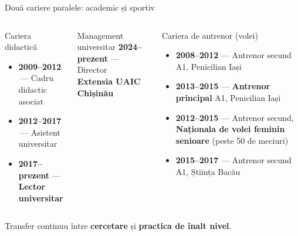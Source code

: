 \documentclass[11pt,aspectratio=169]{beamer}
\newcommand{\sub}[1]{{\small\textcolor{dark!70}{#1}}}
\begin{document}
\begin{frame}{Două cariere paralele: academic și sportiv}
\vspace{0.3em}
\begin{columns}[T,onlytextwidth]
\begin{block}{\faChalkboardTeacher\; Cariera didactică}
\footnotesize
\begin{itemize}\setlength\itemsep{0.55em}
  \item \textbf{2009–2012} \,— Cadru didactic asociat
  \item \textbf{2012–2017} \,— Asistent universitar
  \item \textbf{2017–prezent} — \textcolor{uaicblue}{\textbf{Lector universitar}}
\end{itemize}
\end{block}
\vspace{0.2em}
\begin{alertblock}{\faUniversity\; Management universitar}
\footnotesize \textbf{2024–prezent} — Director\\ \textbf{Extensia UAIC Chișinău} \;\faMapMarker
\end{alertblock}

\begin{exampleblock}{\faVolleyballBall\; Cariera de antrenor (volei)}
\footnotesize
\begin{itemize}\setlength\itemsep{0.45em}
  \item \textbf{2008–2012} — Antrenor secund A1, Penicilian Iași
  \item \textbf{2013–2015} — \textbf{Antrenor principal} A1, Penicilian Iași
  \item \textbf{2012–2015} — Antrenor secund, \textbf{Naționala de volei feminin senioare} \sub{(peste 50 de meciuri)}
  \item \textbf{2015–2017} — Antrenor secund A1, Știința Bacău
\end{itemize}
\end{exampleblock}
\end{columns}
\vspace{0.4em}
\begin{center}\sub{Transfer continuu între \textbf{cercetare} și \textbf{practica de înalt nivel}.}\end{center}
\end{frame}
\end{document}
